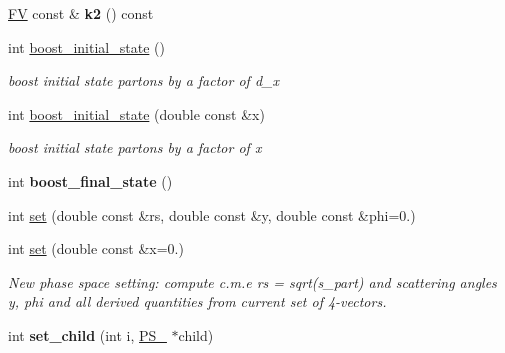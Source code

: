 \begin{DoxyCompactItemize}
\item 
\hypertarget{classPS__2__2_af926b46a1c778aa2e89e6c21ca7fbe1b}{}\hyperlink{classFV}{F\+V} const \& {\bfseries k2} () const \label{classPS__2__2_af926b46a1c778aa2e89e6c21ca7fbe1b}

\item 
\hypertarget{classPS__2__2_a62103a2d987ed8b04918d584e1c7c562}{}int \hyperlink{classPS__2__2_a62103a2d987ed8b04918d584e1c7c562}{boost\+\_\+initial\+\_\+state} ()\label{classPS__2__2_a62103a2d987ed8b04918d584e1c7c562}

\begin{DoxyCompactList}\small\item\em boost initial state partons by a factor of d\+\_\+x \end{DoxyCompactList}\item 
\hypertarget{classPS__2__2_abdf4c563c0c67169a478fb7719581a35}{}int \hyperlink{classPS__2__2_abdf4c563c0c67169a478fb7719581a35}{boost\+\_\+initial\+\_\+state} (double const \&x)\label{classPS__2__2_abdf4c563c0c67169a478fb7719581a35}

\begin{DoxyCompactList}\small\item\em boost initial state partons by a factor of x \end{DoxyCompactList}\item 
\hypertarget{classPS__2__2_a397211db7a5b9781886cc55dae1d23d3}{}int {\bfseries boost\+\_\+final\+\_\+state} ()\label{classPS__2__2_a397211db7a5b9781886cc55dae1d23d3}

\item 
int \hyperlink{classPS__2__2_add28db38c9779539849ecb4384432911}{set} (double const \&rs, double const \&y, double const \&phi=0.)
\item 
\hypertarget{classPS__2__2_ae66bec7df54e50255d0e3e5d779e0dae}{}int \hyperlink{classPS__2__2_ae66bec7df54e50255d0e3e5d779e0dae}{set} (double const \&x=0.)\label{classPS__2__2_ae66bec7df54e50255d0e3e5d779e0dae}

\begin{DoxyCompactList}\small\item\em New phase space setting\+: compute c.\+m.\+e rs = sqrt(s\+\_\+part) and scattering angles y, phi and all derived quantities from current set of 4-\/vectors. \end{DoxyCompactList}\item 
\hypertarget{classPS__2__2_a7ed4acdee85fea6b129aa9801cb8d3c7}{}int {\bfseries set\+\_\+child} (int i, \hyperlink{classPS__2}{P\+S\+\_} $\ast$child)\label{classPS__2__2_a7ed4acdee85fea6b129aa9801cb8d3c7}


\end{DoxyCompactItemize}
